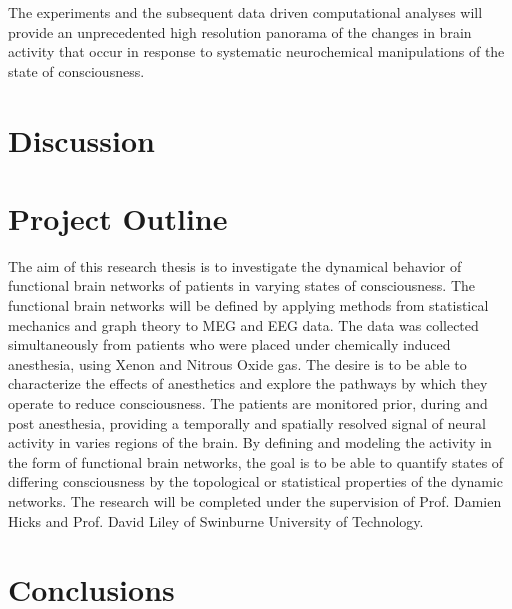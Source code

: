 \documentclass{article}
\begin{document}
The experiments and the subsequent data driven computational analyses will provide an unprecedented high resolution panorama of the changes in brain activity that occur in response to systematic neurochemical manipulations of the state of consciousness.
\section{Discussion}

\section{Project Outline}
The aim of this research thesis is to investigate the dynamical behavior of functional brain networks of patients in varying states of consciousness. The functional brain networks will be defined by applying methods from statistical mechanics and graph theory to MEG and EEG data. The data was collected simultaneously from patients who were placed under chemically induced anesthesia, using Xenon and Nitrous Oxide gas. The desire is to be able to characterize the effects of anesthetics and explore the pathways by which they operate to reduce consciousness. The patients are monitored prior, during and post anesthesia, providing a temporally and spatially resolved signal of neural activity in varies regions of the brain. By defining and modeling the activity in the form of functional brain networks, the goal is to be able to quantify states of differing consciousness by the topological or statistical properties of the dynamic networks. The research will be completed under the supervision of Prof. Damien Hicks and Prof. David Liley of Swinburne University of Technology.

\section{Conclusions}


\cite{zart}

\nocite{*}


\end{document}
